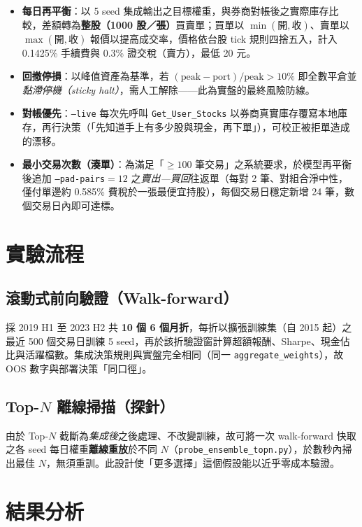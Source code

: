 \documentclass[11pt, fontset=none]{ctexart}
\begin{document}
\begin{itemize}[leftmargin=2em]
  \item \textbf{每日再平衡}：以 5 seed 集成輸出之目標權重，與券商對帳後之實際庫存比較，差額轉為\textbf{整股（1000 股／張）}買賣單；買單以 $\min(\text{開},\text{收})$、賣單以 $\max(\text{開},\text{收})$ 報價以提高成交率，價格依台股 tick 規則四捨五入，計入 0.1425\% 手續費與 0.3\% 證交稅（賣方），最低 20 元。
  \item \textbf{回撤停損}：以峰值資產為基準，若 $(\text{peak}-\text{port})/\text{peak} > 10\%$ 即全數平倉並\emph{黏滯停機（sticky halt）}，需人工解除——此為實盤的最終風險防線。
  \item \textbf{對帳優先}：\texttt{--live} 每次先呼叫 \texttt{Get\_User\_Stocks} 以券商真實庫存覆寫本地庫存，再行決策（「先知道手上有多少股與現金，再下單」），可校正被拒單造成的漂移。
  \item \textbf{最小交易次數（湊單）}：為滿足「$\geq 100$ 筆交易」之系統要求，於模型再平衡後追加 \texttt{--pad-pairs}$=12$ 之\emph{賣出—買回}往返單（每對 2 筆、對組合淨中性，僅付單邊約 0.585\% 費稅於一張最便宜持股），每個交易日穩定新增 24 筆，數個交易日內即可達標。
\end{itemize}

\section{實驗流程}

\subsection{滾動式前向驗證（Walk-forward）}
採 2019 H1 至 2023 H2 共 \textbf{10 個 6 個月折}，每折以擴張訓練集（自 2015 起）之最近 500 個交易日訓練 5 seed，再於該折驗證窗計算超額報酬、Sharpe、現金佔比與活躍檔數。集成決策規則與實盤完全相同（同一 \texttt{aggregate\_weights}），故 OOS 數字與部署決策「同口徑」。

\subsection{Top-$N$ 離線掃描（探針）}\label{sec:topn}
由於 Top-$N$ 截斷為\emph{集成後}之後處理、不改變訓練，故可將一次 walk-forward 快取之各 seed 每日權重\textbf{離線重放}於不同 $N$（\texttt{probe\_ensemble\_topn.py}），於數秒內掃出最佳 $N$，無須重訓。此設計使「更多選擇」這個假設能以近乎零成本驗證。

\section{結果分析}
\end{document}
